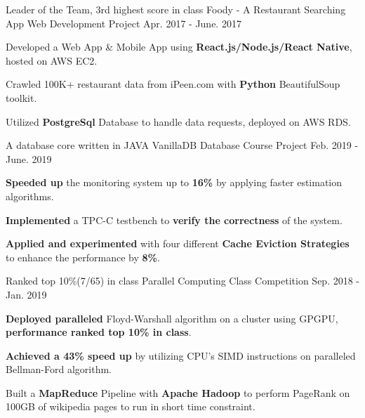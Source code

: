 


\begin{cventries}




\cventry
{Leader of the Team, 3rd highest score in class} %
{Foody - A Restaurant Searching App} %
{Web Development Project} %
{Apr. 2017 - June. 2017} %
{ %
\begin{cvitems}
 \item Developed a Web App \& Mobile App using \textbf{React.js/Node.js/React Native}, hosted on AWS EC2. 
 \item Crawled 100K+ restaurant data from iPeen.com with \textbf{Python} BeautifulSoup toolkit.
 \item Utilized \textbf{PostgreSql} Database to handle data requests, deployed on AWS RDS.
\end{cvitems}
}

\cventry
{A database core written in JAVA} %
{VanillaDB} %
{Database Course Project} %
{Feb. 2019 - June. 2019} %
{ %
\begin{cvitems}
\item \textbf{Speeded up} the monitoring system up to \textbf{16\%} by applying faster estimation algorithms.
\item \textbf{Implemented} a TPC-C testbench to \textbf{verify the correctness} of the system.  
\item \textbf{Applied and experimented} with four different \textbf{Cache Eviction Strategies} to enhance the performance by \textbf{8\%}.
\end{cvitems}
}

\cventry
{Ranked top 10\%(7/65) in class} %
{Parallel Computing} %
{Class Competition} %
{Sep. 2018 - Jan. 2019} %
{ %
\begin{cvitems}
  \item \textbf{Deployed paralleled} Floyd-Warshall algorithm on a cluster using GPGPU, \textbf{performance ranked top 10\% in class}.
  \item \textbf{Achieved a 43\% speed up} by utilizing CPU's SIMD instructions on paralleled Bellman-Ford algorithm.
  \item Built a \textbf{MapReduce} Pipeline with \textbf{Apache Hadoop} to perform PageRank on 100GB of wikipedia pages to run in short time constraint. 
\end{cvitems}
}


\end{cventries}
